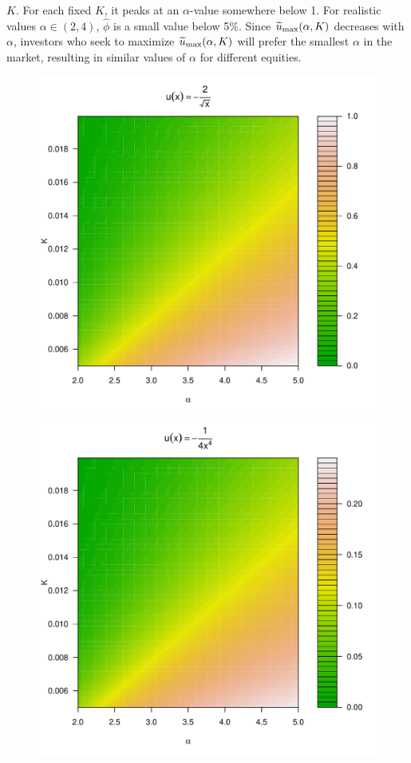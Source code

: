 $K$. For each fixed $K$, it peaks at an $\alpha$-value somewhere below
1. For realistic values $\alpha\in (2, 4)$, $\hat\phi$ is a
small value below 5\%.
Since $\widetilde u_{\rm max}(\alpha, K)$ decreases with
$\alpha$, investors who seek to maximize $\widetilde u_{\rm max}(\alpha, K)$
will prefer the smallest $\alpha$ in the market, resulting in similar
values of $\alpha$ for different equities.
\begin{figure}[htb!]
  \begin{minipage}{0.25\linewidth}
    \includegraphics[width=\textwidth]{phi_hat_pareto5e-1_A.pdf}    
  \end{minipage}\hfill
  \begin{minipage}{0.25\linewidth}
    \includegraphics[width=\textwidth]{phi_hat_pareto4_A.pdf}

\end{minipage}
\end{figure}

